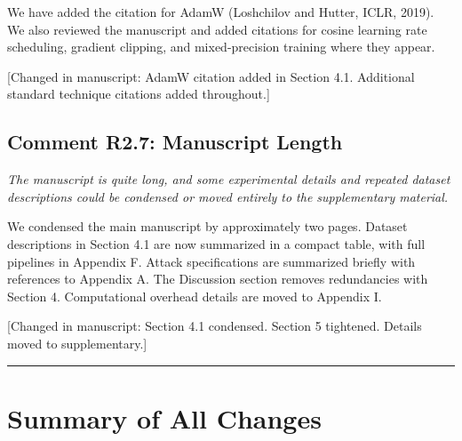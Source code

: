 \documentclass[12pt,a4paper]{article}
\newcommand{\reviewertext}[1]{\textcolor{reviewercolor}{\textit{#1}}}
\newcommand{\response}[1]{\textcolor{responsecolor}{#1}}
\newcommand{\changed}[1]{\textcolor{changecolor}{[Changed in manuscript: #1]}}
\begin{document}
\bigskip

\response{We have added the citation for AdamW (Loshchilov and Hutter, ICLR, 2019). We also reviewed the manuscript and added citations for cosine learning rate scheduling, gradient clipping, and mixed-precision training where they appear.}

\changed{AdamW citation added in Section 4.1. Additional standard technique citations added throughout.}

\bigskip

\subsection*{Comment R2.7: Manuscript Length}

\reviewertext{The manuscript is quite long, and some experimental details and repeated dataset descriptions could be condensed or moved entirely to the supplementary material.}

\bigskip

\response{We condensed the main manuscript by approximately two pages. Dataset descriptions in Section 4.1 are now summarized in a compact table, with full pipelines in Appendix F. Attack specifications are summarized briefly with references to Appendix A. The Discussion section removes redundancies with Section 4. Computational overhead details are moved to Appendix I.}

\changed{Section 4.1 condensed. Section 5 tightened. Details moved to supplementary.}

\bigskip
\hrule
\bigskip

\section*{Summary of All Changes}
\end{document}
